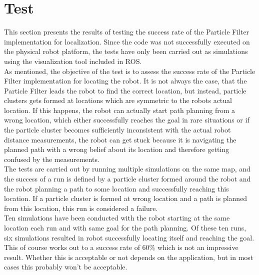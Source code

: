 
\section{Test} %
\label{sec:test}

This section presents the results of testing the success rate of the Particle Filter implementation for localization. Since the code was not successfully executed on the physical robot platform, the tests have only been carried out as simulations using the visualization tool included in ROS.\\

As mentioned, the objective of the test is to assess the success rate of the Particle Filter implementation for locating the robot. It is not always the case, that the Particle Filter leads the robot to find the correct location, but instead, particle clusters gets formed at locations which are symmetric to the robots actual location. If this happens, the robot can actually start path planning from a wrong location, which either successfully reaches the goal in rare situations or if the particle cluster becomes sufficiently inconsistent with the actual robot distance measurements, the robot can get stuck because it is navigating the planned path with a wrong belief about its location and therefore getting confused by the measurements.\\

The tests are carried out by running multiple simulations on the same map, and the success of a run is defined by a particle cluster formed around the robot and the robot planning a path to some location and successfully reaching this location. If a particle cluster is formed at wrong location and a path is planned from this location, this run is considered a failure.\\

Ten simulations have been conducted with the robot starting at the same location each run and with same goal for the path planning. Of these ten runs, six simulations resulted in robot successfully locating itself and reaching the goal. This of course works out to a success rate of 60\% which is not an impressive result. Whether this is acceptable or not depends on the application, but in most cases this probably won't be acceptable.

